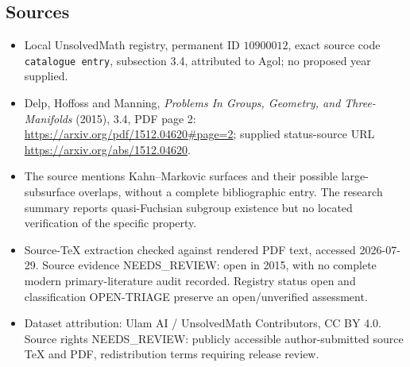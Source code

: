 \documentclass[11pt]{article}
\begin{document}
\subsection{Sources}
\begin{itemize}
\item Local UnsolvedMath registry, permanent ID \(10900012\), exact source code \texttt{catalogue entry}, subsection 3.4, attributed to Agol; no proposed year supplied.
\item Delp, Hoffoss and Manning, \emph{Problems In Groups, Geometry, and Three-Manifolds} (2015), 3.4, PDF page 2: \url{https://arxiv.org/pdf/1512.04620#page=2}; supplied status-source URL \url{https://arxiv.org/abs/1512.04620}.
\item The source mentions Kahn--Markovic surfaces and their possible large-subsurface overlaps, without a complete bibliographic entry. The research summary reports quasi-Fuchsian subgroup existence but no located verification of the specific property.
\item Source-TeX extraction checked against rendered PDF text, accessed 2026-07-29. Source evidence NEEDS\_REVIEW: open in 2015, with no complete modern primary-literature audit recorded. Registry status open and classification OPEN-TRIAGE preserve an open/unverified assessment.
\item Dataset attribution: Ulam AI / UnsolvedMath Contributors, CC BY 4.0. Source rights NEEDS\_REVIEW: publicly accessible author-submitted source TeX and PDF, redistribution terms requiring release review.
\end{itemize}
\end{document}
